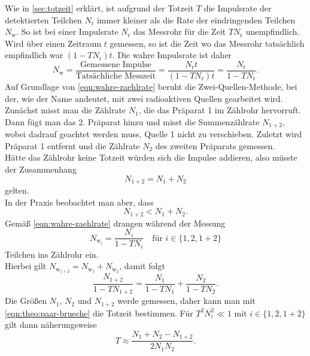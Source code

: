 Wie in \autoref{sec:totzeit} erklärt, ist aufgrund der Totzeit $T$ die Impulsrate der detektierten Teilchen $N_\text{r}$
immer kleiner als die Rate der eindringenden Teilchen $N_\text{w}$. So ist bei einer Impulsrate $N_\text{r}$ das 
Messrohr für die Zeit $TN_\text{r}$ unempfindlich. Wird über einen Zeitraum $t$ gemessen, so ist die Zeit wo
das Messrohr tatsächlich empfindlich war $(1-TN_\text{r})t$. Die wahre Impulsrate ist daher
\begin{equation}
	N_\text{w} = \frac{\text{Gemessene Impulse}}{\text{Tatsächliche Messzeit}}
	= \frac{N_\text{r} t}{(1-TN_\text{r}) t} = \frac{N_\text{r}}{1 - TN_\text{r}}.
	\label{eqn:wahre-zaehlrate}
\end{equation}
\noindent
Auf Grundlage von \autoref{eqn:wahre-zaehlrate} beruht die Zwei-Quellen-Methode, bei der, wie der Name andeutet, mit
zwei radioaktiven Quellen gearbeitet wird.
Zunächst misst man die Zählrate $N_1$, die das Präparat 1 im Zählrohr hervorruft. Dann fügt man das 2. Präparat hinzu
und misst die Summenzählrate $N_{1+2}$, wobei dadrauf geachtet werden muss, Quelle 1 nicht zu verschieben. Zuletzt
wird Präparat 1 entfernt und die Zählrate $N_2$ des zweiten Präparats gemessen.
\\
Hätte das Zählrohr keine Totzeit würden sich die Impulse addieren, also müsste der Zusammenhang
\begin{equation}
	N_{1+2} = N_1 + N_2
\end{equation}
gelten. \\
In der Praxis beobachtet man aber, dass
\begin{equation}
	N_{1+2} < N_1 + N_2.
\end{equation}
Gemäß \autoref{eqn:wahre-zaehlrate} drangen während der Messung
\begin{equation}
	N_{{\text{w}_i}} = \frac{N_i}{1 - TN_i} 
		\quad \text{für } i \in \{1, 2, 1+2\}
\end{equation}
Teilchen ins Zählrohr ein.
\\
Hierbei gilt $N_{\text{w}_{1+2}} = N_{\text{w}_{1}} + N_{\text{w}_{2}}$, damit folgt
\begin{equation}
	\frac{N_{1+2}}{1 - TN_{1+2}} =
	\frac{N_1}{1 - TN_1} +
	\frac{N_2}{1 - TN_2} .
	\label{eqn:theo:paar-brueche}
\end{equation}
\noindent
Die Größen $N_1$, $N_2$ und $N_{1+2}$ werde gemessen, daher kann man mit \autoref{eqn:theo:paar-brueche} die 
Totzeit bestimmen. Für $T^2N_i^2 \ll 1$ mit $i \in \{1, 2, 1+2\}$ gilt dann näherungsweise
\begin{equation}
	T \approx \frac{N_1 + N_2 - N_{1+2}}{2N_1N_2}.
	\label{eqn:totzeit-naeherung}
\end{equation}

